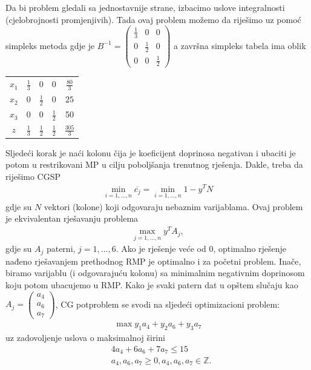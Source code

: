 \documentclass[a4paper, utf8, 11pt, colorlinks]{book}
\begin{document}
Da bi problem gledali sa jednostavnije strane, izbacimo uslove integralnosti (cjelobrojnosti promjenjivih). Tada ovaj problem možemo da riješimo uz pomoć simpleks metoda gdje je 
$B^{-1} =\begin{pmatrix}
	    \frac{1}{3} & 0 & 0 \\
	    0 & \frac{1}{2} & 0  \\
	    0 &   0 & \frac{1}{2}
\end{pmatrix}$ a završna simpleks tabela ima oblik 

\begin{center}
 
\begin{tabular}{cccc|c}
	  $x_1$ &     $\frac{1}{3}$  &   0 & 0  & $\frac{80}{3}$ \\
	  $x_2$ &     0              &  $\frac{1}{2}$  & 0 & $25$ \\
	  $x_3$ &     0              &  0    &  $\frac{1}{2}$  & 50 \\ \hline
	  $z$   &  $\frac{1}{3}$     &  $\frac{1}{2}$   &  $\frac{1}{2}$ & $\frac{305}{3}$ 
\end{tabular}
\end{center}
Sljedeći korak je naći kolonu čija je koeficijent doprinosa negativan i ubaciti je potom u restrikovani MP u cilju poboljšanja trenutnog rješenja. Dakle, treba da riješimo CGSP
\begin{align}
	\min_{i=1,\ldots,n} \overline{c_j} = \min_{i=1,\ldots,n} 1 - y^T N
\end{align}
gdje su $N$ vektori (kolone) koji odgovaraju nebaznim varijablama. Ovaj problem je ekvivalentan rješavanju problema
\begin{align}
	\max_{j=1,\ldots,n} y^T A_j,
\end{align}
gdje su $A_j$ paterni, $j=1,\ldots, 6$. 
Ako je rješenje veće od 0, optimalno rješenje nađeno rješavanjem prethodnog RMP je optimalno i za početni problem. Inače, biramo varijablu (i odgovarajuću kolonu) sa minimalnim negativnim doprinosom koju potom ubacujemo u RMP. Kako je svaki patern dat u opštem slučaju kao $A_j = \begin{pmatrix}
	a_4 \\
	a_6 \\
	a_7
\end{pmatrix}$, CG potproblem se svodi na sljedeći optimizacioni problem:
\begin{align}
	 \max y_1 a_4 + y_2 a_6 + y_3 a_7  
\end{align}
uz zadovoljenje uslova o maksimalnoj širini
\begin{align}
   &	4 a_4 + 6 a_6 + 7 a_7 \leq 15 \\
   &	a_4, a_6, a_7 \geq 0, a_4, a_6, a_7 \in \mathbb{Z}.
\end{align}
\end{document}
